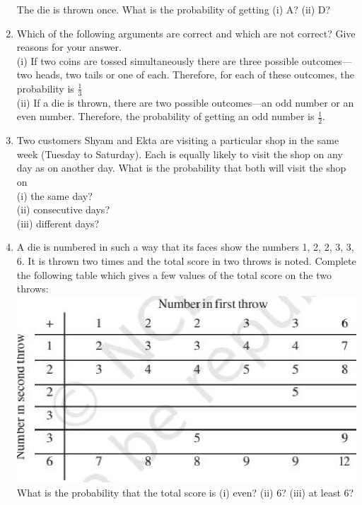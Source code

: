 \begin{enumerate}[label=\thesection.\arabic*.,ref=\thesection.\theenumi]
The die is thrown once. What is the probability of getting (i) A? (ii) D?
\\
\solution

\item Which of the following arguments are correct and which are not correct? Give reasons
for your answer.\\
(i) If two coins are tossed simultaneously there are three possible outcomes—two
heads, two tails or one of each. Therefore, for each of these outcomes, the
probability is $\frac{1}{3}$ \\
(ii) If a die is thrown, there are two possible outcomes—an odd number or an even
number. Therefore, the probability of getting an odd number is $\frac{1}{2}$.
\\
\solution

\item Two customers Shyam and Ekta are visiting a particular shop in the same week (Tuesday
to Saturday). Each is equally likely to visit the shop on any day as on another day. What
is the probability that both will visit the shop on\\
(i) the same day?\\
(ii) consecutive days?\\
(iii) different days?
\\
\solution

\item A die is numbered in such a way that its faces show the numbers 1, 2, 2, 3, 3, 6. It is thrown two times and the total score in two throws is noted. Complete the following
table which gives a few values of the total score on the two throws:
\includegraphics[width=\columnwidth]{./prob/figs/rows.eps}\\
What is the probability that the total score is
(i) even? (ii) 6? (iii) at least 6?
\\
\solution


\end{enumerate}

